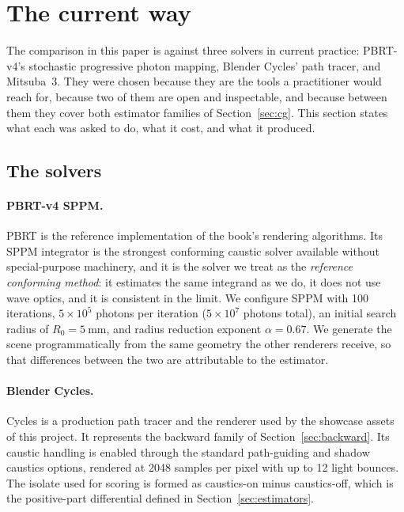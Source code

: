 \section{The current way}
\label{sec:current}

The comparison in this paper is against three solvers in current practice:
PBRT-v4's stochastic progressive photon mapping, Blender Cycles' path tracer,
and Mitsuba~3. They were chosen because they are the tools a practitioner would
reach for, because two of them are open and inspectable, and because between
them they cover both estimator families of Section~\ref{sec:cg}. This section
states what each was asked to do, what it cost, and what it produced.

\subsection{The solvers}
\label{sec:solvers}

\paragraph{PBRT-v4 SPPM.} PBRT \cite{pharr2023} is the reference implementation
of the book's rendering algorithms. Its SPPM integrator
\cite{hachisuka2008} is the strongest conforming caustic solver available
without special-purpose machinery, and it is the solver we treat as the
\emph{reference conforming method}: it estimates the same integrand as we do,
it does not use wave optics, and it is consistent in the limit. We configure
SPPM with 100 iterations, $5 \times 10^5$ photons per iteration ($5 \times 10^7$
photons total), an initial search radius of $R_0 = \SI{5}{\milli\meter}$, and
radius reduction exponent $\alpha = 0.67$. We generate the
scene programmatically from the same geometry the other renderers receive, so that differences between the two are attributable to the estimator.

\paragraph{Blender Cycles.} Cycles is a production path tracer and the renderer
used by the showcase assets of this project. It represents the backward family
of Section~\ref{sec:backward}. Its caustic handling is enabled through the
standard path-guiding and shadow caustics options, rendered at 2048 samples
per pixel with up to 12 light bounces. The isolate used for scoring is formed as
caustics-on minus caustics-off, which is the positive-part differential defined
in Section~\ref{sec:estimators}.

